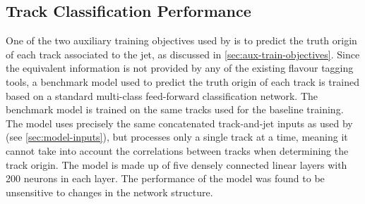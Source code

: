 %



\subsection{Track Classification Performance}\label{sec:gnn_tc_perf}

One of the two auxiliary training objectives used by \GNN is to predict the truth origin of each track associated to the jet, as discussed in \cref{sec:aux-train-objectives}.
Since the equivalent information is not provided by any of the existing flavour tagging tools, a benchmark model used to predict the truth origin of each track is trained based on a standard multi-class feed-forward classification network.
The benchmark model is trained on the same tracks used for the baseline \GNN training.
The model uses precisely the same concatenated track-and-jet inputs as used by \GNN (see \cref{sec:model-inputs}), but processes only a single track at a time, meaning it cannot take into account the correlations between tracks when determining the track origin.
The model is made up of five densely connected linear layers with 200 neurons in each layer.
The performance of the model was found to be unsensitive to changes in the network structure. 

